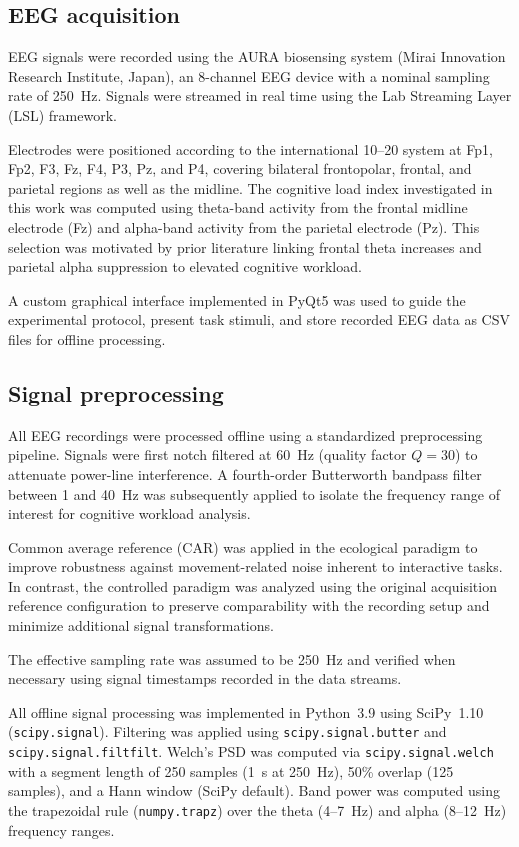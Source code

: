 \documentclass[10pt]{iopart}
\begin{document}
\subsection{EEG acquisition}

EEG signals were recorded using the AURA biosensing system (Mirai Innovation Research Institute, Japan), an 8-channel EEG device with a nominal sampling rate of 250~Hz. Signals were streamed in real time using the Lab Streaming Layer (LSL) framework.

Electrodes were positioned according to the international 10--20 system at Fp1, Fp2, F3, Fz, F4, P3, Pz, and P4, covering bilateral frontopolar, frontal, and parietal regions as well as the midline. The cognitive load index investigated in this work was computed using theta-band activity from the frontal midline electrode (Fz) and alpha-band activity from the parietal electrode (Pz). This selection was motivated by prior literature linking frontal theta increases and parietal alpha suppression to elevated cognitive workload.

A custom graphical interface implemented in PyQt5 was used to guide the experimental protocol, present task stimuli, and store recorded EEG data as CSV files for offline processing.

\subsection{Signal preprocessing}
\label{sec:preprocessing}

All EEG recordings were processed offline using a standardized preprocessing pipeline. Signals were first notch filtered at 60~Hz (quality factor $Q = 30$) to attenuate power-line interference. A fourth-order Butterworth bandpass filter between 1 and 40~Hz was subsequently applied to isolate the frequency range of interest for cognitive workload analysis.

Common average reference (CAR) was applied in the ecological paradigm to improve robustness against movement-related noise inherent to interactive tasks. In contrast, the controlled paradigm was analyzed using the original acquisition reference configuration to preserve comparability with the recording setup and minimize additional signal transformations.

The effective sampling rate was assumed to be 250~Hz and verified
when necessary using signal timestamps recorded in the data streams.

All offline signal processing was implemented in Python~3.9 using
SciPy~1.10 (\texttt{scipy.signal}). Filtering was applied using
\texttt{scipy.signal.butter} and \texttt{scipy.signal.filtfilt}.
Welch's PSD was computed via \texttt{scipy.signal.welch} with a
segment length of 250 samples (1~s at 250~Hz), 50\% overlap
(125 samples), and a Hann window (SciPy default). Band power was
computed using the trapezoidal rule (\texttt{numpy.trapz}) over
the theta (4--7~Hz) and alpha (8--12~Hz) frequency ranges.
\end{document}
